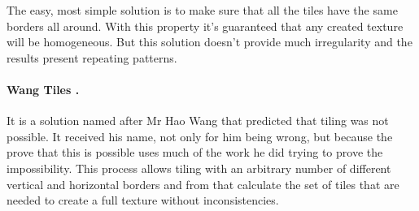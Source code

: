 The easy, most simple solution is to make sure that all the tiles have the same borders all around. With this property it's guaranteed that any created texture will be homogeneous. But this solution doesn't provide much irregularity and the results present repeating patterns. 


\paragraph{Wang Tiles \cite{Cohen2003}.} %
\label{par:wang_tiles_}

 It is a solution named after Mr Hao Wang that predicted that tiling was not possible. It received his name, not only for him being wrong, but because the prove that this is possible uses much of the work he did trying to prove the impossibility. This process allows tiling with an arbitrary number of different vertical and horizontal borders and from that calculate the set of tiles that are needed to create a full texture without inconsistencies. 



